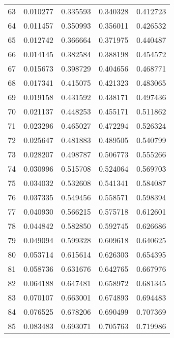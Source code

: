 \begin{center}
\begin{tabular}{|c|c|c|c|c|}
    63    & 0.010277   & 0.335593     & 0.340328     & 0.412723 \\ 
    64    & 0.011457   & 0.350993     & 0.356011     & 0.426532 \\ 
    65    & 0.012742   & 0.366664     & 0.371975     & 0.440487 \\ 
    66    & 0.014145   & 0.382584     & 0.388198     & 0.454572 \\ 
    67    & 0.015673   & 0.398729     & 0.404656     & 0.468771 \\ 
    68    & 0.017341   & 0.415075     & 0.421323     & 0.483065 \\ 
    69    & 0.019158   & 0.431592     & 0.438171     & 0.497436 \\ 
    70    & 0.021137   & 0.448253     & 0.455171     & 0.511862 \\ 
    71    & 0.023296   & 0.465027     & 0.472294     & 0.526324 \\ 
    72    & 0.025647   & 0.481883     & 0.489505     & 0.540799 \\ 
    73    & 0.028207   & 0.498787     & 0.506773     & 0.555266 \\ 
    74    & 0.030996   & 0.515708     & 0.524064     & 0.569703 \\ 
    75    & 0.034032   & 0.532608     & 0.541341     & 0.584087 \\ 
    76    & 0.037335   & 0.549456     & 0.558571     & 0.598394 \\ 
    77    & 0.040930   & 0.566215     & 0.575718     & 0.612601 \\ 
    78    & 0.044842   & 0.582850     & 0.592745     & 0.626686 \\ 
    79    & 0.049094   & 0.599328     & 0.609618     & 0.640625 \\ 
    80    & 0.053714   & 0.615614     & 0.626303     & 0.654395 \\ 
    81    & 0.058736   & 0.631676     & 0.642765     & 0.667976 \\ 
    82    & 0.064188   & 0.647481     & 0.658972     & 0.681345 \\ 
    83    & 0.070107   & 0.663001     & 0.674893     & 0.694483 \\ 
    84    & 0.076525   & 0.678206     & 0.690499     & 0.707369 \\ 
    85    & 0.083483   & 0.693071     & 0.705763     & 0.719986 \\ 

\end{tabular}
\end{center}
